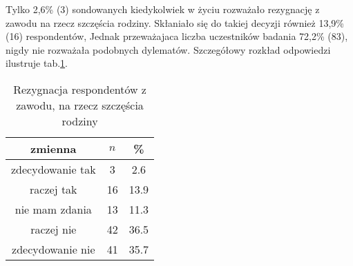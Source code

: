 




Tylko 2,6\%  (3) sondowanych kiedykolwiek w życiu rozważało rezygnację z zawodu na rzecz szczęścia rodziny. Skłaniało się do takiej decyzji również 13,9\% (16) respondentów, Jednak przeważajaca liczba uczestników badania 72,2\% (83), nigdy nie rozważała podobnych dylematów. Szczegółowy rozkład odpowiedzi ilustruje  tab.\ref{tab:Q30}.
\begin{table}[H]
\caption{Rezygnacja respondentów z zawodu, na rzecz szczęścia rodziny}
\centering
\begin{tabular}{ | c | c | c |}
\hline
zmienna & $n$ & \% \\
\hline
zdecydowanie tak  &  3  & 2.6 \\
\hline
raczej tak  &  16  & 13.9\\
\hline
nie mam zdania  &  13  & 11.3 \\
\hline
raczej nie  &  42  & 36.5\\
\hline
zdecydowanie nie  &  41  & 35.7\\
\hline
\end{tabular}
\label{tab:Q30}
\end{table}
